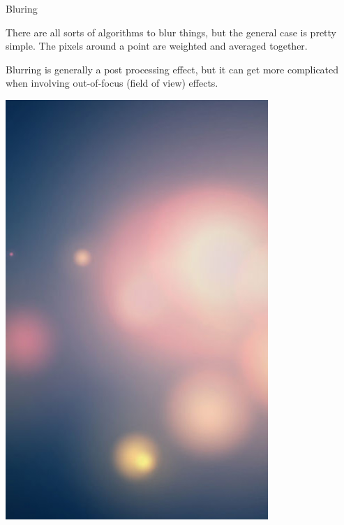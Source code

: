 \documentclass{lug}
\newcommand{\splitslide}[4]{
    \noindent
    \begin{minipage}{#1 \textwidth - #2 }
        #3
    \end{minipage}%
    \hspace{ \dimexpr #2 * 2 \relax }%
    \begin{minipage}{\textwidth - #1 \textwidth - #2 }
        #4
    \end{minipage}
}
\begin{document}
\begin{frame}{Bluring}
    \splitslide{0.65}{.7em}{
        \small

        There are all sorts of algorithms to blur things, but the general case
        is pretty simple. The pixels around a point are weighted and averaged
        together.

        \vspace{1ex}

        Blurring is generally a post processing effect, but it can get more
        complicated when involving out-of-focus (field of view) effects.

    }{
        \includegraphics[width=\textwidth]{graphics/gaussian_blur}
    }
\end{frame}
\end{document}
